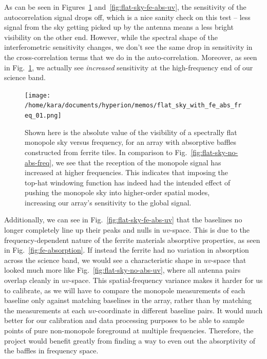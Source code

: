 As can be seen in Figures~\ref{fig:flat-sky-fe-abs-freq} 
and~\ref{fig:flat-sky-fe-abs-uv}, the sensitivity of the autocorrelation signal 
drops off, which is a nice sanity check on this test -- less signal from the 
sky getting picked up by the antenna means a less bright visibility on the 
other end. However, while the spectral shape of the interferometric sensitivity 
changes, we don't see the same drop in sensitivity in the cross-correlation 
terms that we do in the auto-correlation. Moreover, as seen in 
Fig.~\ref{fig:flat-sky-fe-abs-freq}, we actually see \emph{increased} 
sensitivity at the high-frequency end of our science band.

\begin{figure}
    \begin{center}
    \texttt{[image: /home/kara/documents/hyperion/memos/flat\_sky\_with\_fe\_abs\_freq\_01.png]}
    \end{center}
    \caption{
        Shown here is the absolute value of the visibility of a spectrally flat 
        monopole sky versus frequency, for an array with absorptive baffles 
        constructed from ferrite tiles. In comparison to 
        Fig.~\ref{fig:flat-sky-no-abs-freq}, we see that the reception of the 
        monopole signal has increased at higher frequencies. This indicates 
        that imposing the top-hat windowing function has indeed had the 
        intended effect of pushing the monopole sky into higher-order spatial 
        modes, increasing our array's sensitivity to the global signal.
    }
    \label{fig:flat-sky-fe-abs-freq}
\end{figure}

Additionally, we can see in Fig.~\ref{fig:flat-sky-fe-abs-uv} that the 
baselines no longer completely line up their peaks and nulls in $uv$-space.  
This is due to the frequency-dependent nature of the ferrite materials 
absorptive properties, as seen in Fig.~\ref{fig:fe-absorption}. If instead the 
ferrite had no variation in absorption across the science band, we would see a 
characteristic shape in $uv$-space that looked much more like 
Fig.~\ref{fig:flat-sky-no-abs-uv}, where all antenna pairs overlap cleanly in 
$uv$-space. This spatial-frequency variance makes it harder for us to 
calibrate, as we will have to compare the monopole measurements of each 
baseline only against matching baselines in the array, rather than by matching 
the measurements at each $uv$-coordinate in different baseline pairs. It would 
much better for our calibration and data processing purposes to be able to 
sample points of pure non-monopole foreground at multiple frequencies.  
Therefore, the project would benefit greatly from finding a way to even out the 
absorptivity of the baffles in frequency space.

